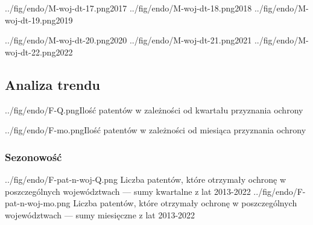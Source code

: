   \figsidesTri
{../fig/endo/M-woj-dt-17.png}{2017}
{../fig/endo/M-woj-dt-18.png}{2018}
{../fig/endo/M-woj-dt-19.png}{2019}

  \figsidesTri
{../fig/endo/M-woj-dt-20.png}{2020}
{../fig/endo/M-woj-dt-21.png}{2021}
{../fig/endo/M-woj-dt-22.png}{2022}



  \newpage



  \newpage\subsection
{Analiza trendu}



  \fig
{../fig/endo/F-Q.png}{Ilość patentów w zależności od kwartału przyznania ochrony}

  \fig
{../fig/endo/F-mo.png}{Ilość patentów w zależności od miesiąca przyznania ochrony}





  \newpage\subsubsection
{Sezonowość}

  \figsides
{../fig/endo/F-pat-n-woj-Q.png}
{ Liczba patentów, które otrzymały ochronę w poszczególnych województwach 
  --- sumy kwartalne z lat 2013-2022 }
{../fig/endo/F-pat-n-woj-mo.png}
{ Liczba patentów, które otrzymały ochronę w poszczególnych województwach 
  --- sumy miesięczne z lat 2013-2022 }